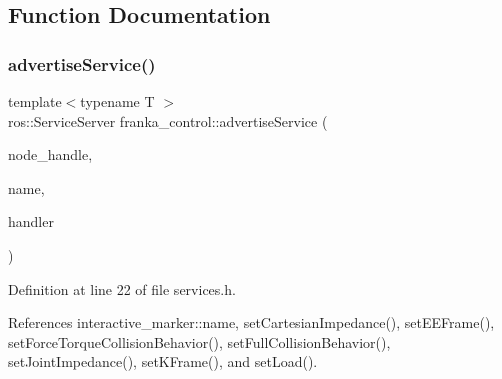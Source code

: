 \subsection{Function Documentation}
\mbox{\label{namespacefranka__control_ad9a13c60c284e90d4a1663071e5e1f33}} 
\subsubsection{\texorpdfstring{advertise\+Service()}{advertiseService()}}
{\footnotesize\ttfamily template$<$typename T $>$ \\
ros\+::\+Service\+Server franka\+\_\+control\+::advertise\+Service (\begin{DoxyParamCaption}\item[{ros\+::\+Node\+Handle \&}]{node\+\_\+handle,  }\item[{const std\+::string \&}]{name,  }\item[{std\+::function$<$ void(typename T\+::\+Request \&, typename T\+::\+Response \&)$>$}]{handler }\end{DoxyParamCaption})}



Definition at line 22 of file services.\+h.



References interactive\+\_\+marker\+::name, set\+Cartesian\+Impedance(), set\+E\+E\+Frame(), set\+Force\+Torque\+Collision\+Behavior(), set\+Full\+Collision\+Behavior(), set\+Joint\+Impedance(), set\+K\+Frame(), and set\+Load().


